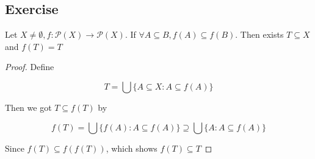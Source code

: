 \subsection{Exercise}

\begin{exercise}
    Let $X \ne \emptyset, f: \mathscr{P}(X) \to \mathscr{P}(X)$. If $\forall A \subseteq B, f(A) \subseteq f(B)$. Then
    exists $T \subseteq X$ and $f(T) = T$
\end{exercise}


\begin{proof}
   Define 

   \[
        T = \bigcup \{ A \subseteq X: A \subseteq f(A) \}
   \]

   Then we got $T \subseteq f(T)$ by

   \[
    f(T) = \bigcup \{ f(A): A \subseteq f(A) \} \supseteq  \bigcup \{ A: A \subseteq f(A) \}
   \]

   Since $f(T) \subseteq f(f(T))$, which shows $f(T) \subseteq T$

\end{proof}
